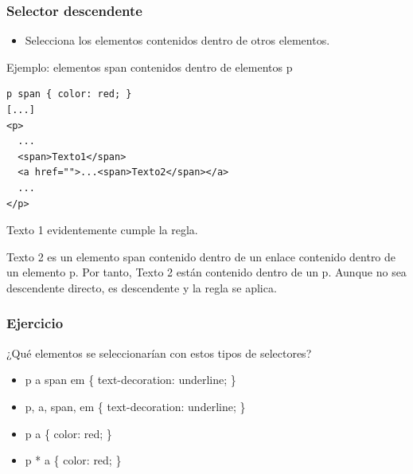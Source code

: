 \documentclass[ucs]{beamer}
\begin{document}
\begin{frame}[fragile]
\frametitle{Selector descendente}

\begin{itemize}
  \item Selecciona los elementos contenidos dentro de otros elementos. 
\end{itemize}
Ejemplo: elementos span contenidos dentro de elementos p


  \begin{footnotesize}
  \begin{verbatim}
p span { color: red; }
[...]
<p>
  ...
  <span>Texto1</span>
  <a href="">...<span>Texto2</span></a>
  ...
</p>
  \end{verbatim}
  \end{footnotesize}

Texto 1 evidentemente cumple la regla. 

Texto 2 es un elemento span contenido dentro de un enlace contenido dentro de un elemento
p.
Por tanto, Texto 2 están contenido dentro de un p.
Aunque no sea descendente directo, es descendente y la regla se aplica.

\end{frame}


\begin{frame}
\frametitle{Ejercicio}

¿Qué elementos se seleccionarían con estos tipos de selectores?

\begin{itemize}
  \item p a span em \{ text-decoration: underline; \}
  \item p, a, span, em \{ text-decoration: underline; \}
  \item p a \{ color: red; \}
  \item p * a \{ color: red; \}
\end{itemize}

\end{frame}

\end{document}
